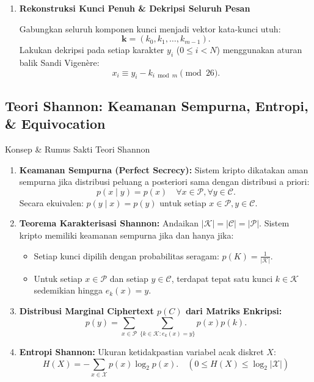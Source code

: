 \documentclass[11pt,a4paper]{article}
\begin{document}
\begin{enumerate}[label=\textbf{Tahap \arabic* :}, leftmargin=*]
    \item \textbf{Rekonstruksi Kunci Penuh \& Dekripsi Seluruh Pesan}
    
    Gabungkan seluruh komponen kunci menjadi vektor kata-kunci utuh:
    \[
    \mathbf{k} = (k_0, k_1, \dots, k_{m-1}).
    \]
    Lakukan dekripsi pada setiap karakter $y_i$ ($0 \le i < N$) menggunakan aturan balik Sandi Vigenère:
    \[
    x_i \equiv y_i - k_{i \bmod m} \pmod{26}.
    \]
\end{enumerate}

\newpage
\subsection{Teori Shannon: Keamanan Sempurna, Entropi, \& Equivocation}

\begin{teoribox}{Konsep \& Rumus Sakti Teori Shannon}
\begin{enumerate}[leftmargin=*]
    \item \textbf{Keamanan Sempurna (Perfect Secrecy):} Sistem kripto dikatakan aman sempurna jika distribusi peluang a posteriori sama dengan distribusi a priori:
    \[
    p(x \mid y) = p(x) \quad \forall x \in \mathcal{P}, \forall y \in \mathcal{C}.
    \]
    Secara ekuivalen: $p(y \mid x) = p(y)$ untuk setiap $x \in \mathcal{P}, y \in \mathcal{C}$.
    
    \item \textbf{Teorema Karakterisasi Shannon:} Andaikan $|\mathcal{K}| = |\mathcal{C}| = |\mathcal{P}|$. Sistem kripto memiliki keamanan sempurna jika dan hanya jika:
    \begin{itemize}
        \item Setiap kunci dipilih dengan probabilitas seragam: $p(K) = \frac{1}{|\mathcal{K}|}$.
        \item Untuk setiap $x \in \mathcal{P}$ dan setiap $y \in \mathcal{C}$, terdapat tepat satu kunci $k \in \mathcal{K}$ sedemikian hingga $e_k(x) = y$.
    \end{itemize}
    
    \item \textbf{Distribusi Marginal Ciphertext $p(C)$ dari Matriks Enkripsi:}
    \[
    p(y) = \sum_{x \in \mathcal{P}} \sum_{\{k \in \mathcal{K} : e_k(x) = y\}} p(x) p(k).
    \]
    
    \item \textbf{Entropi Shannon:} Ukuran ketidakpastian variabel acak diskret $X$:
    \[
    H(X) = -\sum_{x \in \mathcal{X}} p(x) \log_2 p(x). \quad (0 \le H(X) \le \log_2 |\mathcal{X}|)
    \]
    

\end{enumerate}
\end{teoribox}
\end{document}
